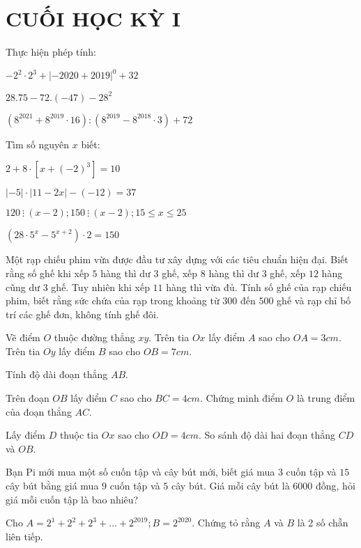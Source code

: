 \section{CUỐI HỌC KỲ I}
\setcounter{ex}{0}
\begin{ex}
	Thực hiện phép tính:
	\begin{listEX}
	\item $-2^{2} \cdot 2^{3}+|-2020+2019|^{0}+32$
	\item $28.75-72 .(-47)-28^{2}$
	\item $\left(8^{2021}+8^{2019} \cdot 16\right):\left(8^{2019}-8^{2018} \cdot 3\right)+72$
	\end{listEX}
\end{ex}
\begin{ex}
	Tìm số nguyên $x$ biết:
	\begin{listEX}[2]
	\item $2+8 \cdot\left[x+(-2)^{3}\right]=10$
	\item $|-5| \cdot|11-2 x|-(-12)=37$
	\item $120~\vdots~(x-2) ; 150~\vdots~(x-2) ; 15 \leq x \leq 25$
	\item $\left(28 \cdot 5^{x}-5^{x+2}\right) \cdot 2=150$
	\end{listEX}
\end{ex}
\begin{ex}
	Một rạp chiếu phim vừa được đầu tư xây dựng với các tiêu chuẩn hiện đại. Biết rằng số ghế khi xếp $5$ hàng thì dư $3$ ghế, xếp $8$ hàng thì dư $3$ ghế, xếp $12$ hàng cũng dư $3$ ghế. Tuy nhiên khi xếp $11$ hàng thì vừa đủ. Tính số ghế của rạp chiếu phim, biết rằng sức chứa của rạp trong khoảng từ $300$ đến $500$ ghế và rạp chỉ bố trí các ghế đơn, không tính ghế đôi. 
\end{ex}
\begin{ex}
	Vẽ điểm $O$ thuộc đường thẳng $xy$. Trên tia $Ox$ lấy điểm $A$ sao cho $OA = 3cm$. Trên tia $Oy$ lấy điểm $B$ sao cho $OB = 7cm$.
		\begin{listEX}
			\item Tính độ dài đoạn thẳng $AB$.
	\item Trên đoạn $OB$ lấy điểm $C$ sao cho $BC = 4cm$. Chứng minh điểm $O$ là trung điểm của đoạn thẳng $AC$.
	\item Lấy điểm $D$ thuộc tia $Ox$ sao cho $OD = 4cm$. So sánh độ dài hai đoạn thẳng $CD$ và $OB$.
		\end{listEX}
\end{ex}
\begin{ex}
	Bạn Pi mới mua một số cuốn tập và cây bút mới, biết giá mua $3$ cuốn tập và $15$ cây bút bằng giá mua $9$ cuốn tập và $5$ cây bút. Giá mỗi cây bút là $6000$ đồng, hỏi giá mỗi cuốn tập là bao nhiêu?
\end{ex}
\begin{ex}
	Cho $A=2^{1}+2^{2}+2^{3}+\ldots+2^{2019} ; B=2^{2020}$. Chứng tỏ rằng $A$ và $B$ là 2 số chẵn liên tiếp.
\end{ex}